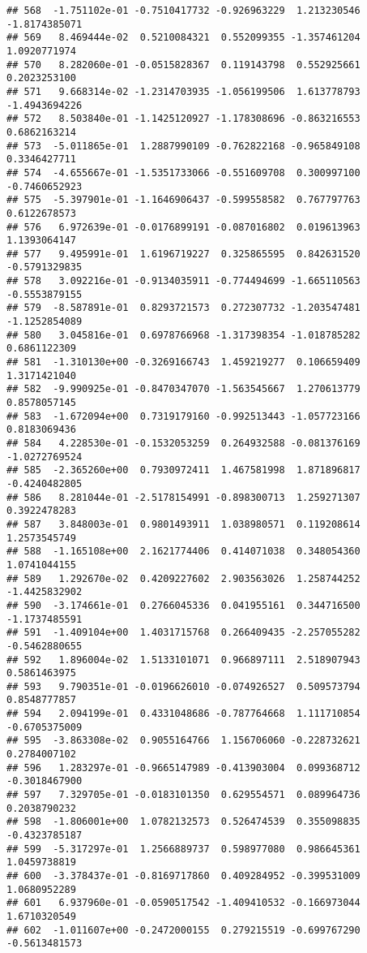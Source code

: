 \documentclass[
]{article}
\begin{document}
\begin{verbatim}
## 568  -1.751102e-01 -0.7510417732 -0.926963229  1.213230546 -1.8174385071
## 569   8.469444e-02  0.5210084321  0.552099355 -1.357461204  1.0920771974
## 570   8.282060e-01 -0.0515828367  0.119143798  0.552925661  0.2023253100
## 571   9.668314e-02 -1.2314703935 -1.056199506  1.613778793 -1.4943694226
## 572   8.503840e-01 -1.1425120927 -1.178308696 -0.863216553  0.6862163214
## 573  -5.011865e-01  1.2887990109 -0.762822168 -0.965849108  0.3346427711
## 574  -4.655667e-01 -1.5351733066 -0.551609708  0.300997100 -0.7460652923
## 575  -5.397901e-01 -1.1646906437 -0.599558582  0.767797763  0.6122678573
## 576   6.972639e-01 -0.0176899191 -0.087016802  0.019613963  1.1393064147
## 577   9.495991e-01  1.6196719227  0.325865595  0.842631520 -0.5791329835
## 578   3.092216e-01 -0.9134035911 -0.774494699 -1.665110563 -0.5553879155
## 579  -8.587891e-01  0.8293721573  0.272307732 -1.203547481 -1.1252854089
## 580   3.045816e-01  0.6978766968 -1.317398354 -1.018785282  0.6861122309
## 581  -1.310130e+00 -0.3269166743  1.459219277  0.106659409  1.3171421040
## 582  -9.990925e-01 -0.8470347070 -1.563545667  1.270613779  0.8578057145
## 583  -1.672094e+00  0.7319179160 -0.992513443 -1.057723166  0.8183069436
## 584   4.228530e-01 -0.1532053259  0.264932588 -0.081376169 -1.0272769524
## 585  -2.365260e+00  0.7930972411  1.467581998  1.871896817 -0.4240482805
## 586   8.281044e-01 -2.5178154991 -0.898300713  1.259271307  0.3922478283
## 587   3.848003e-01  0.9801493911  1.038980571  0.119208614  1.2573545749
## 588  -1.165108e+00  2.1621774406  0.414071038  0.348054360  1.0741044155
## 589   1.292670e-02  0.4209227602  2.903563026  1.258744252 -1.4425832902
## 590  -3.174661e-01  0.2766045336  0.041955161  0.344716500 -1.1737485591
## 591  -1.409104e+00  1.4031715768  0.266409435 -2.257055282 -0.5462880655
## 592   1.896004e-02  1.5133101071  0.966897111  2.518907943  0.5861463975
## 593   9.790351e-01 -0.0196626010 -0.074926527  0.509573794  0.8548777857
## 594   2.094199e-01  0.4331048686 -0.787764668  1.111710854 -0.6705375009
## 595  -3.863308e-02  0.9055164766  1.156706060 -0.228732621  0.2784007102
## 596   1.283297e-01 -0.9665147989 -0.413903004  0.099368712 -0.3018467900
## 597   7.329705e-01 -0.0183101350  0.629554571  0.089964736  0.2038790232
## 598  -1.806001e+00  1.0782132573  0.526474539  0.355098835 -0.4323785187
## 599  -5.317297e-01  1.2566889737  0.598977080  0.986645361  1.0459738819
## 600  -3.378437e-01 -0.8169717860  0.409284952 -0.399531009  1.0680952289
## 601   6.937960e-01 -0.0590517542 -1.409410532 -0.166973044  1.6710320549
## 602  -1.011607e+00 -0.2472000155  0.279215519 -0.699767290 -0.5613481573

\end{verbatim}
\end{document}

